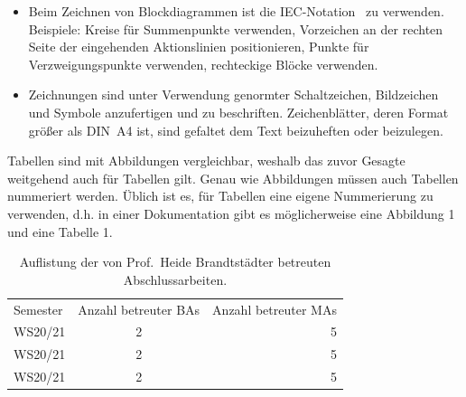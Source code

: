 \begin{itemize}
    \item Beim Zeichnen von Blockdiagrammen ist die IEC-Notation~\cite{IECControltech} zu verwenden. Beispiele: Kreise für Summenpunkte verwenden, Vorzeichen an der rechten Seite der eingehenden Aktionslinien positionieren, Punkte für Verzweigungspunkte verwenden, rechteckige Blöcke verwenden.
    \item Zeichnungen sind unter Verwendung genormter Schaltzeichen, Bildzeichen und Symbole anzufertigen und zu beschriften. Zeichenblätter, deren Format größer als DIN~A4 ist, sind gefaltet dem Text beizuheften oder beizulegen.
\end{itemize}







 
Tabellen sind mit Abbildungen vergleichbar, weshalb das zuvor Gesagte weitgehend auch für Tabellen gilt. Genau wie Abbildungen müssen auch Tabellen nummeriert werden. Üblich ist es, für Tabellen eine eigene Nummerierung zu verwenden, d.h. in einer Dokumentation gibt es möglicherweise eine Abbildung 1 und eine Tabelle 1.


\begin{table}[h]
    \centering
   \begin{tabular}{lcr}
	Semester   &Anzahl betreuter BAs   & Anzahl betreuter MAs\\
    WS20/21     &2      &5\\
    WS20/21     &2      &5\\
    WS20/21     &2      &5\\
\end{tabular}
	\caption{Auflistung der von Prof.~Heide Brandtstädter betreuten Abschlussarbeiten.}
	\label{tab:BAsMas}
\end{table}







